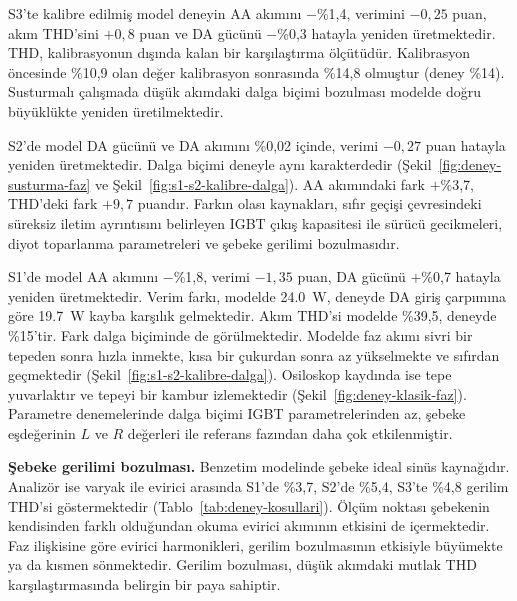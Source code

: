 S3'te kalibre edilmiş model deneyin AA akımını $-$\%1,4, verimini $-0{,}25$ puan, akım THD'sini $+0{,}8$ puan ve DA gücünü $-$\%0,3 hatayla yeniden üretmektedir. THD, kalibrasyonun dışında kalan bir karşılaştırma ölçütüdür. Kalibrasyon öncesinde \%10,9 olan değer kalibrasyon sonrasında \%14,8 olmuştur (deney \%14). Susturmalı çalışmada düşük akımdaki dalga biçimi bozulması modelde doğru büyüklükte yeniden üretilmektedir.

S2'de model DA gücünü ve DA akımını \%0,02 içinde, verimi $-0{,}27$ puan hatayla yeniden üretmektedir. Dalga biçimi deneyle aynı karakterdedir (Şekil~\ref{fig:deney-susturma-faz} ve Şekil~\ref{fig:s1-s2-kalibre-dalga}). AA akımındaki fark $+$\%3,7, THD'deki fark $+9{,}7$ puandır. Farkın olası kaynakları, sıfır geçişi çevresindeki süreksiz iletim ayrıntısını belirleyen IGBT çıkış kapasitesi ile sürücü gecikmeleri, diyot toparlanma parametreleri ve şebeke gerilimi bozulmasıdır.

S1'de model AA akımını $-$\%1,8, verimi $-1{,}35$ puan, DA gücünü $+$\%0,7 hatayla yeniden üretmektedir. Verim farkı, modelde \SI{24.0}{\watt}, deneyde DA giriş çarpımına göre \SI{19.7}{\watt} kayba karşılık gelmektedir. Akım THD'si modelde \%39,5, deneyde \%15'tir. Fark dalga biçiminde de görülmektedir. Modelde faz akımı sivri bir tepeden sonra hızla inmekte, kısa bir çukurdan sonra az yükselmekte ve sıfırdan geçmektedir (Şekil~\ref{fig:s1-s2-kalibre-dalga}). Osiloskop kaydında ise tepe yuvarlaktır ve tepeyi bir kambur izlemektedir (Şekil~\ref{fig:deney-klasik-faz}). Parametre denemelerinde dalga biçimi IGBT parametrelerinden az, şebeke eşdeğerinin $L$ ve $R$ değerleri ile referans fazından daha çok etkilenmiştir.

\textbf{Şebeke gerilimi bozulması.} Benzetim modelinde şebeke ideal sinüs kaynağıdır. Analizör ise varyak ile evirici arasında S1'de \%3,7, S2'de \%5,4, S3'te \%4,8 gerilim THD'si göstermektedir (Tablo~\ref{tab:deney-kosullari}). Ölçüm noktası şebekenin kendisinden farklı olduğundan okuma evirici akımının etkisini de içermektedir. Faz ilişkisine göre evirici harmonikleri, gerilim bozulmasının etkisiyle büyümekte ya da kısmen sönmektedir. Gerilim bozulması, düşük akımdaki mutlak THD karşılaştırmasında belirgin bir paya sahiptir.


